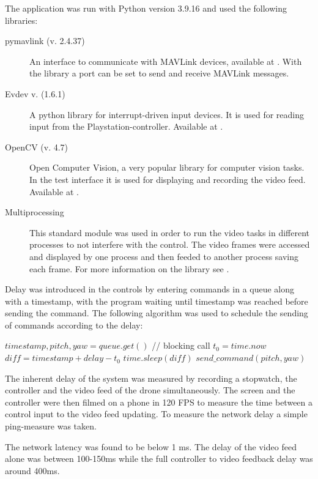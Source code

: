 \documentclass[nofilelist]{cslthse-msc}
\begin{document}
The application was run with Python version 3.9.16 and used the following libraries:
\begin{description} 
   \item [pymavlink (v. 2.4.37)]
   An interface to communicate with MAVLink devices, available at \cite{pymavlink}. With the library a port can be set to send and receive MAVLink messages.
 
   \item [Evdev v. (1.6.1)]
   A python library for interrupt-driven input devices. It is used for reading input from the Playstation-controller. Available at \cite{evdev}.

   \item [OpenCV (v. 4.7)] 
   Open Computer Vision, a very popular library for computer vision tasks. In the test interface it is used for displaying and recording the video feed. Available at \cite{opencv}.

   \item[Multiprocessing]
   This standard module was used in order to run the video tasks in different processes to not interfere with the control. The video frames were accessed and displayed by one process and then feeded to another process saving each frame. For more information on the library see \cite{multiprocessing}.  
\end{description}

Delay was introduced in the controls by entering commands in a queue along with a timestamp, with the program waiting until timestamp was reached before sending the command. The following algorithm was used to schedule the sending of commands according to the delay:
\begin{algorithmic}
   \State $timestamp, pitch, yaw = queue.get()$ // blocking call
   \State $t_{0} = time.now$
   \State $diff = timestamp + delay - t_{0}$
      \State $time.sleep(diff)$
   \EndIf
   \State $send\_command(pitch, yaw)$
   \EndWhile
\end{algorithmic}

The inherent delay of the system was measured by recording a stopwatch, the controller and the video feed of the drone simultaneously. The screen and the controller were then filmed on a phone in 120 FPS to measure the time between a control input to the video feed updating. To measure the network delay a simple ping-measure was taken.

The network latency was found to be below 1 ms. The delay of the video feed alone was between 100-150ms while the full controller to video feedback delay was around 400ms. 
\end{document}
